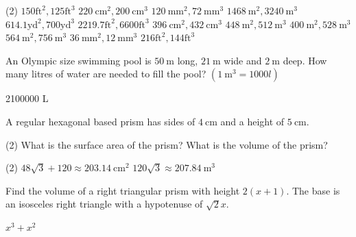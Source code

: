 \documentclass[12pt,fleqn]{book}
\newcommand{\prb}[1]{\begin{Exercise}\parbox[t]{\textwidth-5em}{#1}\end{Exercise}}
\newcommand{\sol}[1]{\begin{Answer}\parbox[t]{\textwidth-5em}{#1}\end{Answer}}
\begin{document}
\sol{
	\begin{tasks}(2)
	\task $150 \mathrm{ft}^2, 125 \mathrm{ft}^3$
	\task $220 \mathrm{~cm}^2, 200 \mathrm{~cm}^3$
	\task $120 \mathrm{~mm}^2, 72 \mathrm{~mm}^3$
	\task $1468 \mathrm{~m}^2, 3240 \mathrm{~m}^3$
	\task $614.1 \mathrm{yd}^2, 700 \mathrm{yd}^3$
	\task $2219.7 \mathrm{ft}^2, 6600 \mathrm{ft}^3$
	\task $396 \mathrm{~cm}^2, 432 \mathrm{~cm}^3$
	\task $448 \mathrm{~m}^2, 512 \mathrm{~m}^3$
	\task $400 \mathrm{~m}^2, 528 \mathrm{~m}^3$
	\task $564 \mathrm{~m}^2, 756 \mathrm{~m}^3$
	\task $36 \mathrm{~mm}^2, 12 \mathrm{~mm}^3$
	\task $216 \mathrm{ft}^2, 144 \mathrm{ft}^3$
	\end{tasks}
}
\prb{ %
	An Olympic size swimming pool is $50 \mathrm{~m}$ long, $21 \mathrm{~m}$ wide and $2 \mathrm{~m}$ deep. How many litres of water are needed to fill the pool? $\left(1 \mathrm{~m}^3=1000 l\right)$
}
\sol{
	2100000 L
}
\vspace{4em}
\prb{%
	A regular hexagonal based prism has sides of $4 \mathrm{~cm}$ and a height of $5 \mathrm{~cm}$.
	\begin{tasks}(2)
		\task What is the surface area of the prism?
		\task What is the volume of the prism?
	\end{tasks}
}
\sol{
	\begin{tasks}(2)
	\task $48 \sqrt{3}+120 \approx 203.14 \mathrm{~cm}^2$
	\task $120 \sqrt{3} \approx 207.84 \mathrm{~m}^3$
	\end{tasks}
}
\clearpage
\prb{%
	Find the volume of a right triangular prism with height $2(x+1)$. The base is an isosceles right triangle with a hypotenuse of $\sqrt{2} x$.
}
\sol{
	$x^3+x^2$
}
\vspace{5em}
\end{document}
